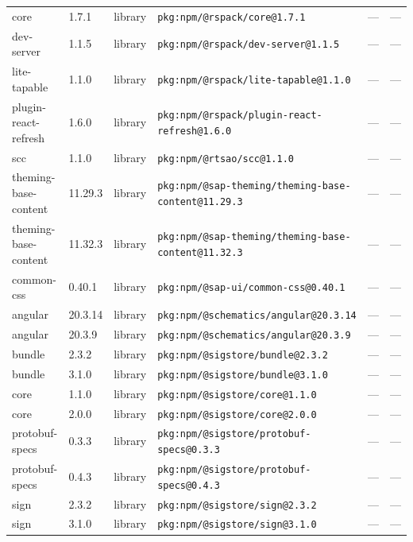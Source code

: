 \documentclass[11pt,a4paper]{article}
\begin{document}
\begin{longtable}{|p{4cm}|p{2cm}|p{1.6cm}|p{5cm}|p{1.5cm}|p{3.5cm}|}
\raggedright core & 1.7.1 & library & \small\texttt{pkg:npm/@rspack/core@1.7.1} & — & \small — \\
\raggedright dev-server & 1.1.5 & library & \small\texttt{pkg:npm/@rspack/dev-server@1.1.5} & — & \small — \\
\raggedright lite-tapable & 1.1.0 & library & \small\texttt{pkg:npm/@rspack/lite-tapable@1.1.0} & — & \small — \\
\raggedright plugin-react-refresh & 1.6.0 & library & \small\texttt{pkg:npm/@rspack/plugin-react-refresh@1.6.0} & — & \small — \\
\raggedright scc & 1.1.0 & library & \small\texttt{pkg:npm/@rtsao/scc@1.1.0} & — & \small — \\
\raggedright theming-base-content & 11.29.3 & library & \small\texttt{pkg:npm/@sap-theming/theming-base-content@11.29.3} & — & \small — \\
\raggedright theming-base-content & 11.32.3 & library & \small\texttt{pkg:npm/@sap-theming/theming-base-content@11.32.3} & — & \small — \\
\raggedright common-css & 0.40.1 & library & \small\texttt{pkg:npm/@sap-ui/common-css@0.40.1} & — & \small — \\
\raggedright angular & 20.3.14 & library & \small\texttt{pkg:npm/@schematics/angular@20.3.14} & — & \small — \\
\raggedright angular & 20.3.9 & library & \small\texttt{pkg:npm/@schematics/angular@20.3.9} & — & \small — \\
\raggedright bundle & 2.3.2 & library & \small\texttt{pkg:npm/@sigstore/bundle@2.3.2} & — & \small — \\
\raggedright bundle & 3.1.0 & library & \small\texttt{pkg:npm/@sigstore/bundle@3.1.0} & — & \small — \\
\raggedright core & 1.1.0 & library & \small\texttt{pkg:npm/@sigstore/core@1.1.0} & — & \small — \\
\raggedright core & 2.0.0 & library & \small\texttt{pkg:npm/@sigstore/core@2.0.0} & — & \small — \\
\raggedright protobuf-specs & 0.3.3 & library & \small\texttt{pkg:npm/@sigstore/protobuf-specs@0.3.3} & — & \small — \\
\raggedright protobuf-specs & 0.4.3 & library & \small\texttt{pkg:npm/@sigstore/protobuf-specs@0.4.3} & — & \small — \\
\raggedright sign & 2.3.2 & library & \small\texttt{pkg:npm/@sigstore/sign@2.3.2} & — & \small — \\
\raggedright sign & 3.1.0 & library & \small\texttt{pkg:npm/@sigstore/sign@3.1.0} & — & \small — \\

\end{longtable}
\end{document}
